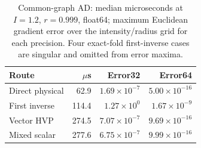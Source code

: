 \begin{table}[!t]
\caption{Common-graph AD: median microseconds at $I=1.2$, $r=0.999$, float64; maximum Euclidean gradient error over the intensity/radius grid for each precision. Four exact-fold first-inverse cases are singular and omitted from error maxima.}
\label{tab:adcost}
\centering\small
\begin{tabular}{@{}lrrr@{}}\toprule
Route & $\mu$s & Error32 & Error64\\\midrule
Direct physical & 62.9 & $1.69\!\times\!10^{-7}$ & $5.00\!\times\!10^{-16}$\\
First inverse & 114.4 & $1.27\!\times\!10^{0}$ & $1.67\!\times\!10^{-9}$\\
Vector HVP & 274.5 & $7.07\!\times\!10^{-7}$ & $9.69\!\times\!10^{-16}$\\
Mixed scalar & 277.6 & $6.75\!\times\!10^{-7}$ & $9.99\!\times\!10^{-16}$\\
\bottomrule
\end{tabular}
\end{table}
